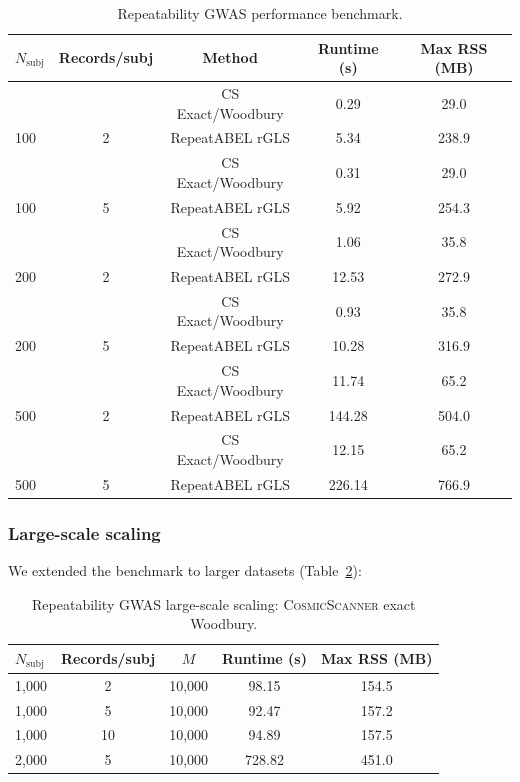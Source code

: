 \documentclass[11pt,a4paper]{article}
\newcommand{\CosmicScanner}{\textsc{CosmicScanner}}
\begin{document}
\begin{table}[H]
  \centering
  \caption{Repeatability GWAS performance benchmark.}
  \label{tab:repeat_perf}
  \begin{threeparttable}
  \begin{tabular}{lcccc}
  \toprule
  $N_{\text{subj}}$ & Records/subj & Method & Runtime (s) & Max RSS (MB) \\
  \midrule
  & & CS Exact/Woodbury & 0.29 & 29.0 \\
  100 & 2 & RepeatABEL rGLS & 5.34 & 238.9 \\
  & & CS Exact/Woodbury & 0.31 & 29.0 \\
  100 & 5 & RepeatABEL rGLS & 5.92 & 254.3 \\
  & & CS Exact/Woodbury & 1.06 & 35.8 \\
  200 & 2 & RepeatABEL rGLS & 12.53 & 272.9 \\
  & & CS Exact/Woodbury & 0.93 & 35.8 \\
  200 & 5 & RepeatABEL rGLS & 10.28 & 316.9 \\
  & & CS Exact/Woodbury & 11.74 & 65.2 \\
  500 & 2 & RepeatABEL rGLS & 144.28 & 504.0 \\
  & & CS Exact/Woodbury & 12.15 & 65.2 \\
  500 & 5 & RepeatABEL rGLS & 226.14 & 766.9 \\
  \bottomrule
  \end{tabular}
  \end{threeparttable}
\end{table}

\subsubsection{Large-scale scaling}

We extended the benchmark to larger datasets (Table~\ref{tab:repeat_large}):

\begin{table}[H]
  \centering
  \caption{Repeatability GWAS large-scale scaling: \CosmicScanner{} exact Woodbury.}
  \label{tab:repeat_large}
  \begin{threeparttable}
  \begin{tabular}{lcccc}
  \toprule
  $N_{\text{subj}}$ & Records/subj & $M$ & Runtime (s) & Max RSS (MB) \\
  \midrule
  1,000 & 2 & 10,000 & 98.15 & 154.5 \\
  1,000 & 5 & 10,000 & 92.47 & 157.2 \\
  1,000 & 10 & 10,000 & 94.89 & 157.5 \\
  2,000 & 5 & 10,000 & 728.82 & 451.0 \\
  \bottomrule
  \end{tabular}
  \end{threeparttable}
\end{table}
\end{document}
